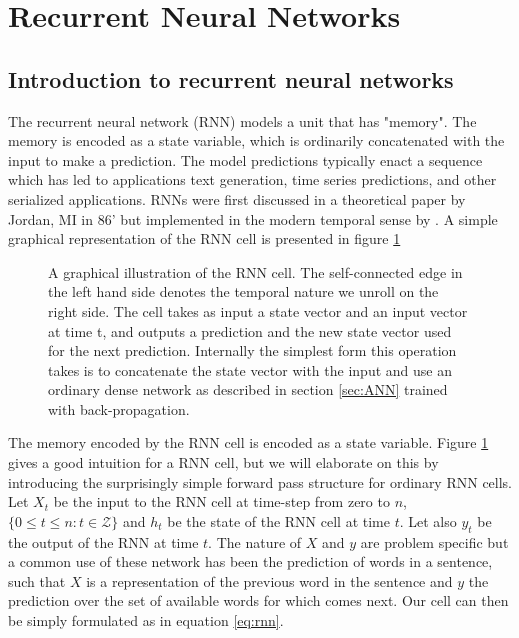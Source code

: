 
\section{Recurrent Neural Networks}\label{sec:rnn}

\subsection{Introduction to recurrent neural networks}

The recurrent neural network (RNN) models a unit that has "memory". The memory is encoded as a state variable, which is ordinarily concatenated with the input to make a prediction. The model predictions typically enact a sequence which has led to applications text generation, time series predictions, and other serialized applications. RNNs were first discussed in a theoretical paper by Jordan, MI in 86' but implemented in the modern temporal sense by \citet{Pearlmutter1989}. A simple graphical representation of the RNN cell is presented in figure \ref{fig:rnn}

\begin{figure}[h]
\centering
{} %

\caption[Recurrent neural network cell]{A graphical illustration of the RNN cell. The self-connected edge in the left hand side denotes the temporal nature we unroll on the right side. The cell takes as input a state vector and an input vector at time t, and outputs a prediction and the new state vector used for the next prediction. Internally the simplest form this operation takes is to concatenate the state vector with the input and use an ordinary dense network as described in section \ref{sec:ANN} trained with back-propagation.}\label{fig:rnn}
\end{figure}

The memory encoded by the RNN cell is encoded as a state variable. Figure \ref{fig:rnn} gives a good intuition for a RNN cell, but we will elaborate on this by introducing the surprisingly simple forward pass structure for ordinary RNN cells. Let $X_t$ be the input to the RNN cell at time-step from zero to $n$, $\{0 \leq t \leq n: t \in \mathcal{Z} \}$ and $h_t$ be the state of the RNN cell at time $t$. Let also $y_t$ be the output of the RNN at time $t$. The nature of $X$ and $y$ are problem specific but a common use of these network has been the prediction of words in a sentence, such that $X$ is a representation of the previous word in the sentence and $y$ the prediction over the set of available words for which comes next. Our cell can then be simply formulated as in equation \ref{eq:rnn}.

